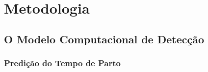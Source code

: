 \chapter{Metodologia}
\section{O Modelo Computacional de Detecção}
\subsection{Predição do Tempo de Parto}





